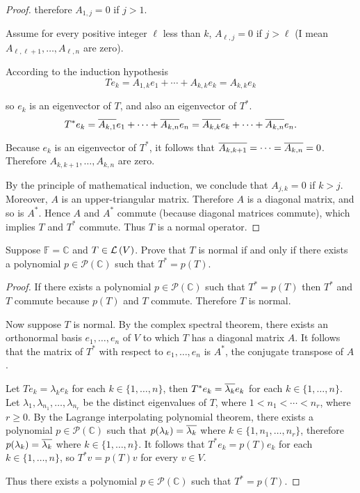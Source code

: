 \begin{proof}
    therefore $A_{1,j} = 0$ if $j > 1$.

    Assume for every positive integer $\ell$ less than $k$, $A_{\ell,j} = 0$ if $j > \ell$ (I mean $A_{\ell,\ell+1}, \ldots, A_{\ell, n}$ are zero).

    According to the induction hypothesis
    \[
        Te_{k} = A_{1,k}e_{1} + \cdots + A_{k,k}e_{k} = A_{k,k}e_{k}
    \]

    so $e_{k}$ is an eigenvector of $T$, and also an eigenvector of $T^{*}$.
    \[
        T^{*}e_{k} = \overline{A_{k,1}}e_{1} + \cdots + \overline{A_{k,n}}e_{n} = \overline{A_{k,k}}e_{k} + \cdots + \overline{A_{k,n}}e_{n}.
    \]

    Because $e_{k}$ is an eigenvector of $T^{*}$, it follows that $\overline{A_{k,k+1}} = \cdots = \overline{A_{k,n}} = 0$. Therefore $A_{k, k+1}, \ldots, A_{k, n}$ are zero.

    By the principle of mathematical induction, we conclude that $A_{j,k} = 0$ if $k > j$. Moreover, $A$ is an upper-triangular matrix. Therefore $A$ is a diagonal matrix, and so is $A^{*}$. Hence $A$ and $A^{*}$ commute (because diagonal matrices commute), which implies $T$ and $T^{*}$ commute. Thus $T$ is a normal operator.
\end{proof}
\newpage

\begin{exercise}\label{chapter7:sectionB:exercise9}
    Suppose $\mathbb{F} = \mathbb{C}$ and $T\in\mathcal{L}\left({V}\right)$. Prove that $T$ is normal if and only if there exists a polynomial $p\in\mathscr{P}(\mathbb{C})$ such that $T^{*} = p(T)$.
\end{exercise}

\begin{proof}
    If there exists a polynomial $p\in\mathscr{P}(\mathbb{C})$ such that $T^{*} = p(T)$ then $T^{*}$ and $T$ commute because $p(T)$ and $T$ commute. Therefore $T$ is normal.

    Now suppose $T$ is normal. By the complex spectral theorem, there exists an orthonormal basis $e_{1}, \ldots, e_{n}$ of $V$ to which $T$ has a diagonal matrix $A$. It follows that the matrix of $T^{*}$ with respect to $e_{1}, \ldots, e_{n}$ is $A^{*}$, the conjugate transpose of $A$.

    Let $Te_{k} = \lambda_{k}e_{k}$ for each $k\in\{1,\ldots, n\}$, then $T^{*}e_{k} = \overline{\lambda_{k}}e_{k}$ for each $k\in\{1,\ldots, n\}$. Let $\lambda_{1}, \lambda_{n_{1}}, \ldots, \lambda_{n_{r}}$ be the distinct eigenvalues of $T$, where $1 < n_{1} < \cdots < n_{r}$, where $r\geq 0$. By the Lagrange interpolating polynomial theorem, there exists a polynomial $p\in\mathscr{P}(\mathbb{C})$ such that $p(\lambda_{k}) = \overline{\lambda_{k}}$ where $k\in \{ 1, n_{1}, \ldots, n_{r} \}$, therefore $p(\lambda_{k}) = \overline{\lambda_{k}}$ where $k\in \{ 1, \ldots, n \}$. It follows that $T^{*}e_{k} = p(T)e_{k}$ for each $k\in\{1,\ldots, n\}$, so $T^{*}v = p(T)v$ for every $v\in V$.

    Thus there exists a polynomial $p\in\mathscr{P}(\mathbb{C})$ such that $T^{*} = p(T)$.
\end{proof}
\newpage

